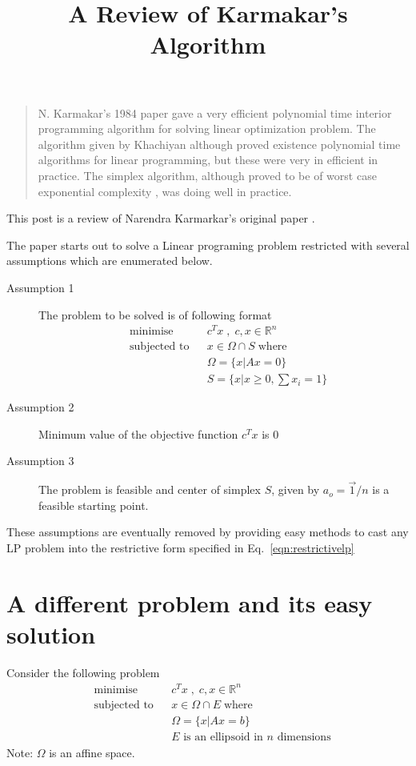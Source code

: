 \documentclass[10pt]{article}
\title{A Review of Karmakar's Algorithm}
\author{}
\date{}
\begin{document}
\onecolumn
\maketitle
\begin{quote}
N. Karmakar's 1984 paper  gave a very efficient polynomial time  interior programming algorithm for solving  linear optimization problem. The algorithm given by  Khachiyan \cite{khachiyan1980polynomial} although  proved existence polynomial time algorithms for linear programming, but these were very in efficient in practice. The simplex algorithm, although proved to be of worst case exponential complexity \cite{goldfarb1994complexity}, was doing well in practice.
\end{quote}

\begin{center}This post is a review of Narendra Karmarkar's original paper \cite{karmarkar1984new}.
\end{center}
\noindent{}The paper starts out to solve a Linear programing problem restricted with several assumptions which are enumerated below. 
\begin{description}
\item[Assumption 1] The problem to be solved is of following format
\begin{align}
&\text{minimise} &&c^Tx\;,\; c,x\in \mathbb{R}^n \label{eqn:restrictivelp}\\
&\text{subjected to} &&x\in \Omega\cap S\;\text{where}\nonumber\\
&&&\Omega =\{x|Ax=0\}\nonumber\\
&&&S = \{x|x\geq0,\sum x_i = 1\}\nonumber
\end{align}
\item[Assumption 2] Minimum value of the objective function $c^Tx$ is $0$
\item[Assumption 3] The problem is feasible and center of simplex $S$, given by $a_o = \vec{1}/n$ is a feasible starting point.
\end{description}

These assumptions are eventually removed by providing easy methods to cast any LP problem into the restrictive form specified in Eq.~\ref{eqn:restrictivelp}

\section{A different problem and its easy solution}
Consider the following problem
\begin{align*}
&\text{minimise} &&c^Tx\;,\; c,x\in \mathbb{R}^n\\
&\text{subjected to} &&x\in \Omega\cap E\;\text{where}\\
&&&\Omega =\{x|Ax=b\}\\
&&&E \text{ is an ellipsoid in $n$ dimensions}
\end{align*}
Note: $\Omega$ is an affine space.
\end{document}
